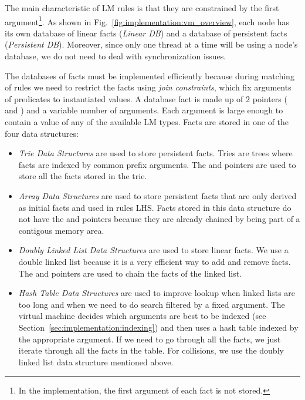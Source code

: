 The main characteristic of LM rules is that they are constrained by the first
argument\footnote{In the implementation, the first argument of each fact is not
   stored.}. As shown in Fig.~\ref{fig:implementation:vm_overview}, each node
has its own database of linear facts (\emph{Linear DB}) and a database of
persistent facts (\emph{Persistent DB}).  Moreover, since only one thread at a
time will be using a node's database, we do not need to deal with
synchronization issues.

The databases of facts must be implemented efficiently because during matching
of rules we need to restrict the facts using \emph{join constraints}, which fix
arguments of predicates to instantiated values. A database fact is made up of 2
pointers ( and ) and a variable number of arguments.
Each argument is large enough to contain a value of any of the available LM types.
Facts are stored in one of the four data structures:

\begin{itemize}

\item \emph{Trie Data Structures} are used to store persistent facts. Tries are
   trees where facts are indexed by common prefix arguments. The 
   and  pointers are used to store all the facts stored in the trie.

\item \emph{Array Data Structures} are used to store persistent facts that are
   only derived as initial facts and used in rules LHS. Facts stored in this
   data structure do not have the  and  pointers
   because they are already chained by being part of a contigous memory area.

\item \emph{Doubly Linked List Data Structures} are used to store linear facts.
   We use a double linked list because it is a very efficient way to add and
   remove facts. The  and  pointers are used to chain
   the facts of the linked list.

\item \emph{Hash Table Data Structures} are used to improve lookup when linked
   lists are too long and when we need to do search filtered by a fixed
   argument. The virtual machine decides which arguments are best to be indexed
   (see Section~\ref{sec:implementation:indexing}) and then uses a hash table
   indexed by the appropriate argument. If we need to go through all the facts,
   we just iterate through all the facts in the table. For collisions, we use
   the doubly linked list data structure mentioned above.

\end{itemize}

